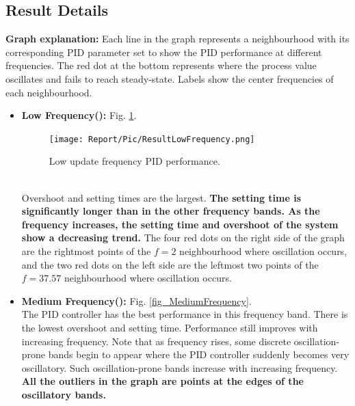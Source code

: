 \documentclass[conference]{IEEEtran}
\begin{document}
\subsection{Result Details}
    \textbf{Graph explanation:} Each line in the graph represents a neighbourhood with its corresponding PID parameter set to show the PID performance at different frequencies. The red dot at the bottom represents where the process value oscillates and fails to reach steady-state. Labels show the center frequencies of each neighbourhood.
\begin{itemize}
    \item \textbf{Low Frequency():} Fig. \ref{fig_LowFrequency}.
        \begin{figure}[htbp]
        \centerline{\texttt{[image: Report/Pic/ResultLowFrequency.png]}}
        \caption{Low update frequency PID performance.}
        \label{fig_LowFrequency}
        \end{figure}
        \\Overshoot and setting times are the largest. \textbf{The setting time is significantly longer than in the other frequency bands. As the frequency increases, the setting time and overshoot of the system show a decreasing trend.} The four red dots on the right side of the graph are the rightmost points of the $f=2$ neighbourhood where oscillation occurs, and the two red dots on the left side are the leftmost two points of the $f=37.57$ neighbourhood where oscillation occurs. 
    \item \textbf{Medium Frequency():} Fig. \ref{fig_MediumFrequency}.
        \\The PID controller has the best performance in this frequency band. There is the lowest overshoot and setting time. Performance still improves with increasing frequency. Note that as frequency rises, some discrete oscillation-prone bands begin to appear where the PID controller suddenly becomes very oscillatory. Such oscillation-prone bands increase with increasing frequency. \textbf{All the outliers in the graph are points at the edges of the oscillatory bands.}

\end{itemize}
\end{document}

